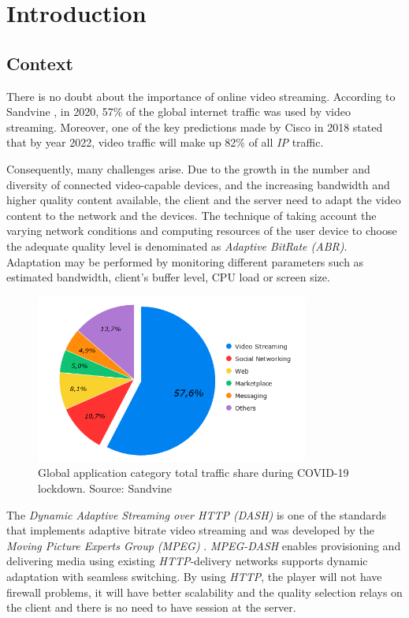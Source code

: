 \chapter{Introduction}
\label{chap:introduction}

\section{Context}
\label{sec:context}

There is no doubt about the importance of online video streaming.
According to Sandvine \cite{sandvine1},
in 2020, 57\% of the global internet traffic was used by video streaming.
Moreover, one of the key predictions made by Cisco in 2018 \cite{cisco1}
stated that by year 2022, video traffic will make up 82\% 
of all \textit{IP} traffic.

Consequently, many challenges arise. Due to the growth in the 
number and diversity of connected video-capable devices, and the 
increasing bandwidth and higher quality content available, the 
client and the server need to adapt the video content to
the network and the devices. The technique of taking account the 
varying network conditions and computing resources of the user 
device to choose the adequate quality level is denominated as
\textit{Adaptive BitRate (ABR)}. Adaptation may be performed by
monitoring different parameters such as estimated bandwidth,
client's buffer level, CPU load or screen size.

\begin{figure}[h]
  \label{fig:chart1}
    \centering
    \includegraphics[width=0.8\textwidth]{img/chart2.png}
    \caption{Global application category total traffic share during COVID-19 lockdown. Source: Sandvine \cite{sandvine1}}
  \end{figure}

The \textit{Dynamic Adaptive Streaming over HTTP (DASH)} is one of the
standards that implements adaptive bitrate video streaming and was developed
by the \textit{Moving Picture Experts Group (MPEG)} \cite{dash1}. \textit{MPEG-DASH} 
enables provisioning and delivering media using existing \textit{HTTP}-delivery 
networks supports dynamic adaptation with seamless switching. By using
\textit{HTTP}, the player will not have firewall problems, it will have better
scalability and the quality selection relays on the client and there is no
need to have session at the server.

